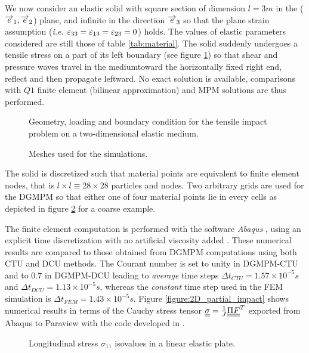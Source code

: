 We now consider an elastic solid with square section of dimension $l=3m$ in the (${\overrightarrow{e}}_1,{\overrightarrow{e}}_2$) plane, and infinite in the direction ${\overrightarrow{e}}_3$ so that the plane strain assumption (\textit{i.e. $\varepsilon_{33}=\varepsilon_{13}=\varepsilon_{23}=0$}) holds. The values of elastic parameters considered are still those of table \ref{tab:material}. The solid suddenly undergoes a tensile stress on a part of its left boundary (see figure \ref{fig:2D_problem}) so that shear and pressure waves travel in the mediumtoward the horizontally fixed right end, reflect and then propagate leftward.
No exact solution is available, comparisons with $Q1$ finite element (bilinear approximation) and MPM solutions are thus performed.
\begin{figure}[h!]
  \centering
  
  \caption{Geometry, loading and boundary condition for the tensile impact problem on a two-dimensional elastic medium.}
  \label{fig:2D_problem}
\end{figure}

\begin{figure}[h!]
  \centering
    
  \caption{Meshes used for the simulations.}
  \label{fig:2d_meshes}
\end{figure}
The solid is discretized such that material points are equivalent to finite element nodes, 
that is $l\times l \equiv 28 \times 28$ particles and nodes. Two arbitrary grids are used for the DGMPM so that either one of four material points lie in every cells as depicted in figure \ref{fig:2d_meshes} for a coarse example.

The finite element computation is performed with the software \textit{Abaqus} \cite{Abaqus}, using an explicit time discretization with no artificial viscosity added . These numerical results are compared to those obtained from DGMPM computations using both CTU and DCU methods. The Courant number is set to unity in DGMPM-CTU and to $0.7$ in DGMPM-DCU leading to \textit{average} time steps $\Delta t_{CTU}=1.57 \times 10^{-5}s$ and $\Delta t_{DCU}=1.13 \times 10^{-5}s$, whereas the \textit{constant} time step used in the FEM simulation is $\Delta t_ {FEM}=1.43 \times 10^{-5} s$. Figure \ref{figure:2D_partial_impact} shows numerical results in terms of the Cauchy stress tensor ${\underline{\underline{\sigma}}} = \frac{1}{J}{\underline{\underline{\Pi}}}{\underline{\underline{F}}}^T$ exported from Abaqus to Paraview with the code developed in \cite{Export_Abaqus}. 


\begin{figure}[h!]
  \centering
  
  \caption{Longitudinal stress $\sigma_{11}$ isovalues in a linear elastic plate.}
  \label{fig:2delast_comparison1}
\end{figure}



